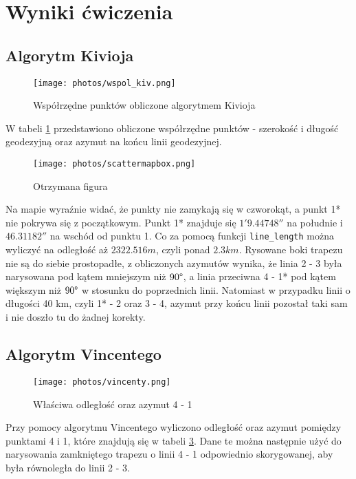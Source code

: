 \documentclass[fleqn,10pt,a4paper]{article}
\begin{document}
\section{Wyniki ćwiczenia}

\subsection{Algorytm Kivioja}
\begin{figure}[H]
  \centering
  \texttt{[image: photos/wspol\_kiv.png]}
  \caption{Współrzędne punktów obliczone algorytmem Kivioja}
  \label{wspol:kiv}
\end{figure}

W tabeli \ref{wspol:kiv} przedstawiono obliczone współrzędne punktów - szerokość i długość geodezyjną oraz azymut na końcu linii geodezyjnej.


\begin{figure}[!h]
  \centering
  \texttt{[image: photos/scattermapbox.png]}
  \caption{Otrzymana figura}
  \label{fig:kiv}
\end{figure}

Na mapie wyraźnie widać, że punkty nie zamykają się w czworokąt, a punkt 1* nie pokrywa się z początkowym.
Punkt 1* znajduje się $1' 9.44748''$ na południe i $46.31182''$ na wschód od punktu 1.
Co za pomocą funkcji \texttt{line\_length} można wyliczyć na odległość aż $2322.516 m$, czyli ponad $2.3 km$.
Rysowane boki trapezu nie są do siebie prostopadłe, z obliczonych azymutów wynika, że linia 2 - 3 była narysowana pod kątem mniejszym niż
$90\degree$, a linia przeciwna 4 - 1* pod kątem większym niż $90\degree$ w stosunku do poprzednich linii.
Natomiast w przypadku linii o długości 40 km, czyli  1* - 2 oraz 3 - 4, azymut przy końcu linii pozostał taki sam i nie 
doszło tu do żadnej korekty.

\subsection{Algorytm Vincentego}

\begin{figure}[H]
  \centering
  \texttt{[image: photos/vincenty.png]}
  \caption{Właściwa odległość oraz azymut 4 - 1}
  \label{az:vincenty}
\end{figure}

Przy pomocy algorytmu Vincentego wyliczono odległość oraz azymut pomiędzy punktami 4 i 1, które znajdują się w tabeli \ref{az:vincenty}. Dane te można następnie
użyć do narysowania zamkniętego trapezu o linii 4 - 1 odpowiednio skorygowanej, aby była równoległa do linii 2 - 3.
\end{document}

